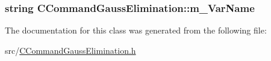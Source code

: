\subsubsection[{\texorpdfstring{m\+\_\+\+Var\+Name}{m_VarName}}]{\setlength{\rightskip}{0pt plus 5cm}string C\+Command\+Gauss\+Elimination\+::m\+\_\+\+Var\+Name\hspace{0.3cm}{\ttfamily [private]}}\hypertarget{classCCommandGaussElimination_a2e619e3d9fb79bca7076ab72c21c09b4}{}\label{classCCommandGaussElimination_a2e619e3d9fb79bca7076ab72c21c09b4}


The documentation for this class was generated from the following file\+:\begin{DoxyCompactItemize}
\item 
src/\hyperlink{CCommandGaussElimination_8h}{C\+Command\+Gauss\+Elimination.\+h}\end{DoxyCompactItemize}

